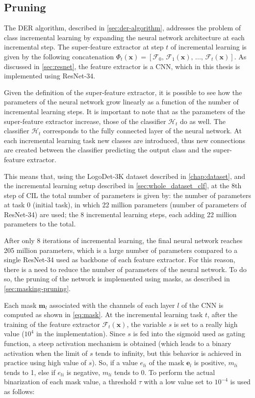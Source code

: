 \subsection{Pruning}
\label{sec:method-pruning}

The DER algorithm, described in \autoref{sec:der-algorithm}, addresses the problem of class incremental learning by expanding the neural network architecture at each incremental step. The super-feature extractor at step $t$ of incremental learning is given by the following concatenation $\Phi_t(\mathbf{x}) = [\mathcal{F}_0, \, \mathcal{F}_1(\mathbf{x}), \, ..., \, \mathcal{F}_t(\mathbf{x})]$. As discussed in \autoref{sec:resnet}, the feature extractor is a CNN, which in this thesis is implemented using ResNet-34.

Given the definition of the super-feature extractor, it is possible to see how the parameters of the neural network grow linearly as a function of the number of incremental learning steps.
It is important to note that as the parameters of the super-feature extractor increase, those of the classifier $\mathcal{H}_t$ do as well.
The classifier $\mathcal{H}_t$ corresponds to the fully connected layer of the neural network. At each incremental learning task new classes are introduced, thus new connections are created between the classifier predicting the output class and the super-feature extractor.

This means that, using the LogoDet-3K dataset described in \autoref{chap:dataset}, and the incremental learning setup described in \autoref{sec:whole_dataset_clf}, at the 8th step of CIL the total number of parameters is given by: the number of parameters at task 0 (initial task), in which 22 million parameters (number of parameters of ResNet-34) are used; the 8 incremental learning steps, each adding 22 million parameters to the total.

After only 8 iterations of incremental learning, the final neural network reaches 205 million parameters, which is a large number of parameters compared to a single ResNet-34 used as backbone of each feature extractor.
For this reason, there is a need to reduce the number of parameters of the neural network.
To do so, the pruning of the network is implemented using masks, as described in \autoref{sec:masking-pruning}.

Each mask $\mathbf{m}_l$ associated with the channels of each layer $l$ of the CNN is computed as shown in \autoref{eq:mask}.
At the incremental learning task $t$, after the training of the feature extractor $\mathcal{F}_t(\mathbf{x})$, the variable $s$ is set to a really high value ($10^{4}$ in the implementation).
Since $s$ is fed into the sigmoid used as gating function, a steep activation mechanism is obtained (which leads to a binary activation when the limit of $s$ tends to infinity, but this behavior is achieved in practice using high value of $s$).
So, if a value $e_{li}$ of the mask $\mathbf{e}_l$ is positive, $m_{li}$ tends to 1, else if $e_{li}$ is negative, $m_{li}$ tends to 0.
To perform the actual binarization of each mask value, a threshold $\tau$ with a low value set to $10^{-4}$ is used as follows:

